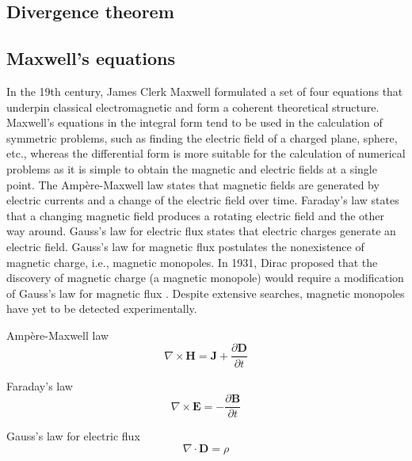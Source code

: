 \subsection*{Divergence theorem}
\subsection*{Maxwell's equations}

In the 19th century, James Clerk Maxwell formulated a set of four equations that underpin classical electromagnetic and form a coherent theoretical structure. 
Maxwell's equations in the integral form tend to be used in the calculation of symmetric problems, such as finding the electric field of a charged plane, sphere, etc., whereas the differential form is more suitable for the calculation of numerical problems as it is simple to obtain the magnetic and electric fields at a single point. The Ampère-Maxwell law states that magnetic fields are generated by electric currents and a change of the electric field over time. Faraday's law states that a changing magnetic field produces a rotating electric field and the other way around. Gauss's law for electric flux states that electric charges generate an electric field. Gauss's law for magnetic flux postulates the nonexistence of magnetic charge, i.e., magnetic monopoles. In 1931, Dirac proposed that the discovery of magnetic charge (a magnetic monopole) would require a modification of Gauss's law for magnetic flux \cite{dirac1931monopole}.  Despite extensive searches, magnetic monopoles have yet to be detected experimentally. 


Ampère-Maxwell law
\begin{equation}
\nabla \times \mathbf{H} =\mathbf{J} + \frac{\partial \mathbf{D}}{\partial t}
\end{equation}

Faraday’s law
\begin{equation}
\nabla \times \mathbf{E} = - \frac{\partial \mathbf{B}}{\partial t}
\end{equation}

Gauss's law for electric flux
\begin{equation}
\nabla \cdot \mathbf{D} = \rho
\end{equation}

